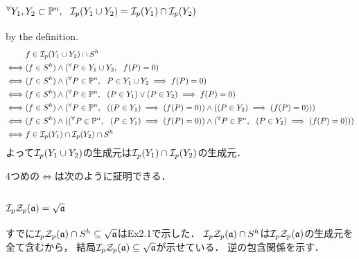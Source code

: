 \documentclass[a4paper]{jsarticle}
\begin{document}
    \subsection{$\Forall{Y_1, Y_2 \subset \proj^n} \defsp(Y_1 \cup Y_2)=\defsp(Y_1) \cap \defsp(Y_2)$}
    by the definition.
    \begin{align*}
        {}&     f \in \defsp(Y_1 \cup Y_2) \cap S^h \\
        \iff&   (f \in S^h) \land (\Forall{P \in Y_1 \cup Y_2} f(P)=0) \\
        \iff&   (f \in S^h) \land (\Forall{P \in \proj^n} P \in Y_1 \cup Y_2 \implies f(P)=0) \\
        \iff&   (f \in S^h) \land (\Forall{P \in \proj^n} (P \in Y_1)  \lor (P \in Y_2) \implies f(P)=0) \\
        \iff&   (f \in S^h) \land (\Forall{P \in \proj^n} ((P \in Y_1) \implies (f(P)=0)) \land ((P \in Y_2) \implies (f(P)=0)))  \\
        \iff&   (f \in S^h) \land ((\Forall{P \in \proj^n} (P \in Y_1) \implies (f(P)=0)) \land (\Forall{P \in \proj^n} (P \in Y_2) \implies (f(P)=0)))  \\
        \iff&   f \in \defsp(Y_1) \cap \defsp(Y_2) \cap S^h
    \end{align*}
    よって$\defsp(Y_1 \cup Y_2)$の生成元は$\defsp(Y_1) \cap \defsp(Y_2)$の生成元．

    4つめの$\iff$は次のように証明できる．
    \begin{prooftree}
    \end{prooftree}

    \subsection{$\defsp \zerosp(\I{a})=\sqrt{\I{a}}$}
    すでに$\defsp \zerosp(\I{a}) \cap S^h \subseteq \sqrt{\I{a}}$はEx2.1で示した．
    $\defsp \zerosp(\I{a}) \cap S^h$は$\defsp \zerosp(\I{a})$の生成元を全て含むから，
    結局$\defsp \zerosp(\I{a}) \subseteq \sqrt{\I{a}}$が示せている．
    逆の包含関係を示す．
\end{document}
